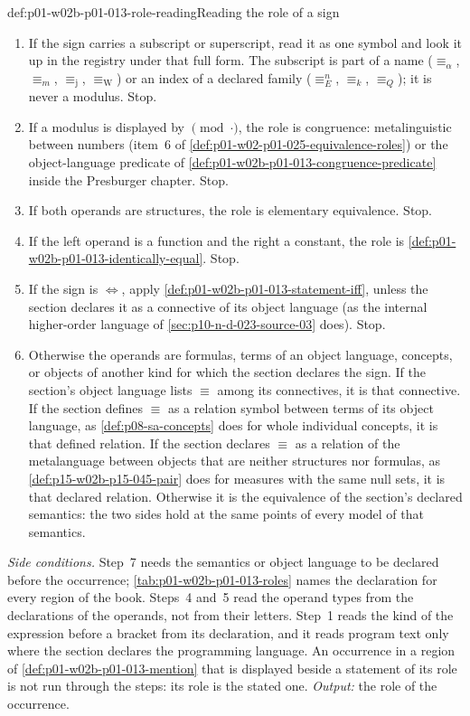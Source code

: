\begin{hbmethod}{def:p01-w02b-p01-013-role-reading}{Reading the role of a sign}
\begin{enumerate}
  expression is defined to abbreviate the right one.  Stop.
  \item If the sign carries a subscript or superscript, read it as one
  symbol and look it up in the registry under that full form.  The subscript
  is part of a name (\(\equiv_\alpha\), \(\equiv_m\), \(\equiv_{\mathrm j}\),
  \(\equiv_{\mathrm W}\)) or an index of a declared family
  (\(\equiv_E^n\), \(\equiv_k\), \(\equiv_Q\)); it is never a modulus.  Stop.
  \item If a modulus is displayed by \(\pmod{\cdot}\), the role is
  congruence: metalinguistic between numbers (item~6 of
  \cref{def:p01-w02-p01-025-equivalence-roles}) or the object-language
  predicate of \cref{def:p01-w02b-p01-013-congruence-predicate} inside the
  Presburger chapter.  Stop.
  \item If both operands are structures, the role is elementary equivalence.
  Stop.
  \item If the left operand is a function and the right a constant, the role
  is \cref{def:p01-w02b-p01-013-identically-equal}.  Stop.
  \item If the sign is \(\Leftrightarrow\), apply
  \cref{def:p01-w02b-p01-013-statement-iff}, unless the section declares it
  as a connective of its object language (as the internal higher-order
  language of \cref{sec:p10-n-d-023-source-03} does).  Stop.
  \item Otherwise the operands are formulas, terms of an object language,
  concepts, or objects of another kind for which the section declares the
  sign.  If the section's object language lists \(\equiv\) among its
  connectives, it is that connective.  If the section defines \(\equiv\)
  as a relation symbol between terms of its object language, as
  \cref{def:p08-sa-concepts} does for whole individual concepts, it is that
  defined relation.  If the section declares \(\equiv\) as a relation of the
  metalanguage between objects that are neither structures nor formulas, as
  \cref{def:p15-w02b-p15-045-pair} does for measures with the same null
  sets, it is that declared relation.  Otherwise it is the equivalence of
  the section's declared semantics: the two sides hold at the same points of
  every model of that semantics.
\end{enumerate}
\emph{Side conditions.}  Step~7 needs the semantics or object language to be
declared before the occurrence; \cref{tab:p01-w02b-p01-013-roles} names the
declaration for every region of the book.  Steps~4 and~5 read the operand
types from the declarations of the operands, not from their letters.  Step~1
reads the kind of the expression before a bracket from its declaration, and
it reads program text only where the section declares the programming
language.  An occurrence in a region of
\cref{def:p01-w02b-p01-013-mention} that is displayed beside a statement of
its role is not run through the steps: its role is the stated one.
\emph{Output:} the role of the occurrence.
\end{hbmethod}

